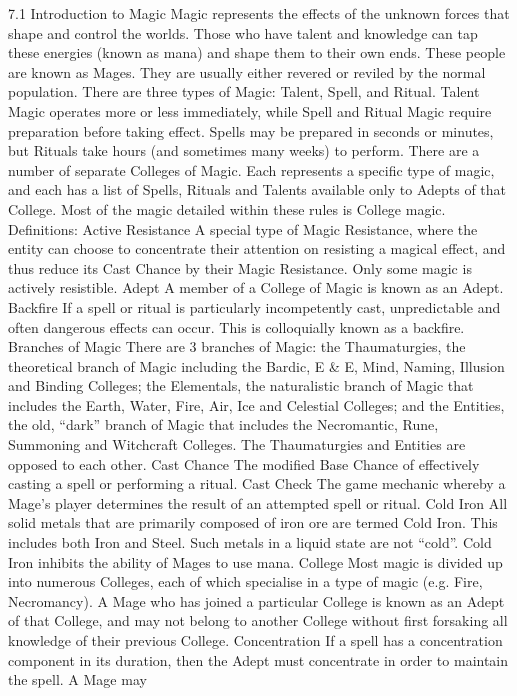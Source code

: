 \documentclass[a4paper]{article}
\begin{document}
\begin{multicols}{3}
7.1 Introduction to Magic
Magic represents the effects of the unknown forces
that shape and control the worlds. Those who have
talent and knowledge can tap these energies
(known as mana) and shape them to their own
ends. These people are known as Mages. They are
usually either revered or reviled by the normal
population.
There are three types of Magic: Talent, Spell, and
Ritual. Talent Magic operates more or less immediately, while Spell and Ritual Magic require
preparation before taking effect. Spells may be
prepared in seconds or minutes, but Rituals take
hours (and sometimes many weeks) to perform.
There are a number of separate Colleges of Magic.
Each represents a specific type of magic, and each
has a list of Spells, Rituals and Talents available
only to Adepts of that College. Most of the magic
detailed within these rules is College magic.
Definitions:
Active Resistance A special type of Magic Resistance, where the entity can choose to concentrate
their attention on resisting a magical effect, and
thus reduce its Cast Chance by their Magic Resistance. Only some magic is actively resistible.
Adept A member of a College of Magic is known
as an Adept.
Backfire If a spell or ritual is particularly incompetently cast, unpredictable and often dangerous
effects can occur. This is colloquially known as a
backfire.
Branches of Magic There are 3 branches of
Magic: the Thaumaturgies, the theoretical branch
of Magic including the Bardic, E & E, Mind, Naming, Illusion and Binding Colleges; the Elementals,
the naturalistic branch of Magic that includes the
Earth, Water, Fire, Air, Ice and Celestial Colleges;
and the Entities, the old, “dark” branch of Magic
that includes the Necromantic, Rune, Summoning
and Witchcraft Colleges. The Thaumaturgies and
Entities are opposed to each other.
Cast Chance The modified Base Chance of effectively casting a spell or performing a ritual.
Cast Check The game mechanic whereby a
Mage’s player determines the result of an attempted spell or ritual.
Cold Iron All solid metals that are primarily composed of iron ore are termed Cold Iron. This includes both Iron and Steel. Such metals in a liquid
state are not “cold”. Cold Iron inhibits the ability of
Mages to use mana.
College Most magic is divided up into numerous
Colleges, each of which specialise in a type of
magic (e.g. Fire, Necromancy). A Mage who has
joined a particular College is known as an Adept of
that College, and may not belong to another College without first forsaking all knowledge of their
previous College.
Concentration If a spell has a concentration component in its duration, then the Adept must concentrate in order to maintain the spell. A Mage may


\end{multicols}
\end{document}
